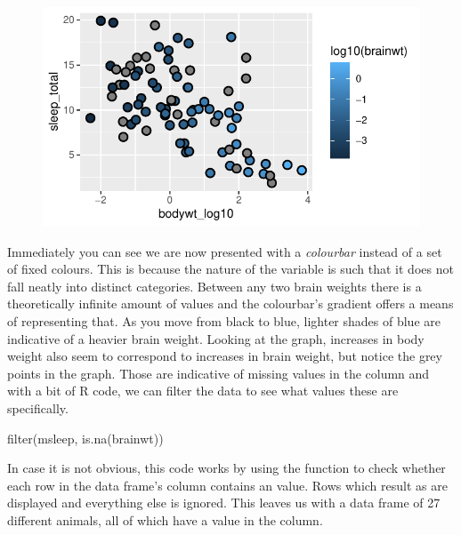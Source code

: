 \begin{figure}[H]
\includegraphics[scale = .75]{graphics/ch2Figs/ggEx_26.pdf}
\end{figure}

Immediately you can see we are now presented with a \textit{colourbar} instead of a set of fixed colours. This is because the nature of the variable  is such that it does not fall neatly into distinct categories.  Between any two brain weights there is a theoretically infinite amount of values and the colourbar's gradient offers a means of representing that. As you move from black to blue, lighter shades of blue are indicative of a heavier brain weight. Looking at the graph, increases in body weight also seem to correspond to increases in brain weight, but notice the grey points in the graph.  Those are indicative of missing values in the  column and with a bit of R code, we can filter the data to see what values these are specifically.

\begin{inR}
filter(msleep, is.na(brainwt))
\end{inR}

\vspace{1em}

In case it is not obvious, this code works by using the  function to check whether each row in the  data frame's   column contains an  value. Rows which result as  are displayed and everything else is ignored. This leaves us with a data frame of 27 different animals, all of which have a  value in the  column.


